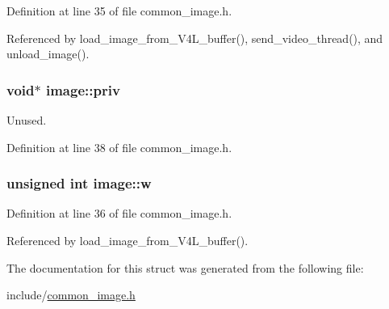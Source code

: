 \-Definition at line 35 of file common\-\_\-image.\-h.



\-Referenced by load\-\_\-image\-\_\-from\-\_\-\-V4\-L\-\_\-buffer(), send\-\_\-video\-\_\-thread(), and unload\-\_\-image().

\hypertarget{structimage_af79bc78a92bf22a8bb06c5ae706a2db9}{
\subsubsection[{priv}]{\setlength{\rightskip}{0pt plus 5cm}void$\ast$ {\bf image\-::priv}}}\label{structimage_af79bc78a92bf22a8bb06c5ae706a2db9}


\-Unused. 



\-Definition at line 38 of file common\-\_\-image.\-h.

\hypertarget{structimage_ac4f737a4fb48b7bf4407d5fbe3da141d}{
\subsubsection[{w}]{\setlength{\rightskip}{0pt plus 5cm}unsigned int {\bf image\-::w}}}\label{structimage_ac4f737a4fb48b7bf4407d5fbe3da141d}


\-Definition at line 36 of file common\-\_\-image.\-h.



\-Referenced by load\-\_\-image\-\_\-from\-\_\-\-V4\-L\-\_\-buffer().



\-The documentation for this struct was generated from the following file\-:\begin{DoxyCompactItemize}
\item 
include/\hyperlink{common__image_8h}{common\-\_\-image.\-h}\end{DoxyCompactItemize}
